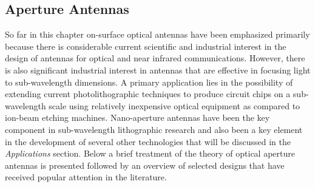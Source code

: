 \subsection{Aperture Antennas}
%
So far in this chapter on-surface optical antennas have been emphasized primarily because there is considerable current scientific and industrial interest in the design of antennas for optical and near infrared communications. However, there is also significant industrial interest in antennas that are effective in focusing light to sub-wavelength dimensions. A primary application lies in the possibility of extending current photolithographic techniques to produce circuit chips on a sub-wavelength scale using relatively inexpensive optical equipment as compared to ion-beam etching machines. Nano-aperture antennas have been the key component in sub-wavelength lithographic research and also been a key element in the development of several other technologies that will be discussed in the \emph{Applications} section. Below a brief treatment of the theory of optical aperture antennas is presented followed by an overview of selected designs that have received popular attention in the literature.
